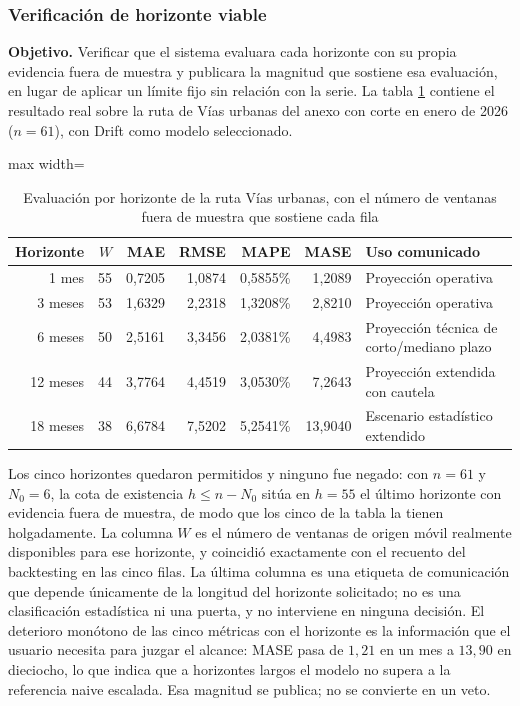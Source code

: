 \documentclass[12pt,letterpaper]{article}
\begin{document}
\subsubsection{Verificación de horizonte viable}

\textbf{Objetivo.} Verificar que el sistema evaluara cada horizonte con su propia evidencia fuera de muestra y publicara la magnitud que sostiene esa evaluación, en lugar de aplicar un límite fijo sin relación con la serie. La tabla \ref{tab:prueba_horizonte_viable} contiene el resultado real sobre la ruta de Vías urbanas del anexo con corte en enero de 2026 ($n = 61$), con Drift como modelo seleccionado.

\begin{table}[H]
\centering
\caption{Evaluación por horizonte de la ruta Vías urbanas, con el número de ventanas fuera de muestra que sostiene cada fila}
\label{tab:prueba_horizonte_viable}
\vspace{\baselineskip}
\scriptsize
\begin{adjustbox}{max width=\textwidth}
\begin{tabular}{rrrrrrl}
\toprule
\textbf{Horizonte} & \textbf{$W$} & \textbf{MAE} & \textbf{RMSE} & \textbf{MAPE} & \textbf{MASE} & \textbf{Uso comunicado} \\
\midrule
1 mes & 55 & 0,7205 & 1,0874 & 0,5855\% & 1,2089 & Proyección operativa \\
3 meses & 53 & 1,6329 & 2,2318 & 1,3208\% & 2,8210 & Proyección operativa \\
6 meses & 50 & 2,5161 & 3,3456 & 2,0381\% & 4,4983 & Proyección técnica de corto/mediano plazo \\
12 meses & 44 & 3,7764 & 4,4519 & 3,0530\% & 7,2643 & Proyección extendida con cautela \\
18 meses & 38 & 6,6784 & 7,5202 & 5,2541\% & 13,9040 & Escenario estadístico extendido \\
\bottomrule
\end{tabular}
\end{adjustbox}
\end{table}

Los cinco horizontes quedaron permitidos y ninguno fue negado: con $n = 61$ y $N_0 = 6$, la cota de existencia $h \leq n - N_0$ sitúa en $h = 55$ el último horizonte con evidencia fuera de muestra, de modo que los cinco de la tabla la tienen holgadamente. La columna $W$ es el número de ventanas de origen móvil realmente disponibles para ese horizonte, y coincidió exactamente con el recuento del backtesting en las cinco filas. La última columna es una etiqueta de comunicación que depende únicamente de la longitud del horizonte solicitado; no es una clasificación estadística ni una puerta, y no interviene en ninguna decisión. El deterioro monótono de las cinco métricas con el horizonte es la información que el usuario necesita para juzgar el alcance: MASE pasa de $1{,}21$ en un mes a $13{,}90$ en dieciocho, lo que indica que a horizontes largos el modelo no supera a la referencia naive escalada. Esa magnitud se publica; no se convierte en un veto.
\end{document}
